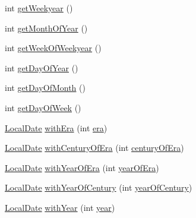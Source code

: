 \begin{DoxyCompactItemize}
\item 
int \hyperlink{classorg_1_1joda_1_1time_1_1_local_date_aee5647dfe46e2e470d4a6ff95a5ca57f}{get\-Weekyear} ()
\item 
int \hyperlink{classorg_1_1joda_1_1time_1_1_local_date_a1711091371774e1d2f689d294de21e87}{get\-Month\-Of\-Year} ()
\item 
int \hyperlink{classorg_1_1joda_1_1time_1_1_local_date_a4cbd39f9a84ff955dab9650f639df700}{get\-Week\-Of\-Weekyear} ()
\item 
int \hyperlink{classorg_1_1joda_1_1time_1_1_local_date_a07bbb72ef5101a1541d2c99e90ed78ce}{get\-Day\-Of\-Year} ()
\item 
int \hyperlink{classorg_1_1joda_1_1time_1_1_local_date_a2c9b55a760e4c8ee0895d5b6a1ae6420}{get\-Day\-Of\-Month} ()
\item 
int \hyperlink{classorg_1_1joda_1_1time_1_1_local_date_a29db7578dc289d66011f096360b4e255}{get\-Day\-Of\-Week} ()
\item 
\hyperlink{classorg_1_1joda_1_1time_1_1_local_date}{Local\-Date} \hyperlink{classorg_1_1joda_1_1time_1_1_local_date_a9f1343ab7a2914e29ab126c4b95c8d22}{with\-Era} (int \hyperlink{classorg_1_1joda_1_1time_1_1_local_date_a764d21effa733f7b34333709e7526a99}{era})
\item 
\hyperlink{classorg_1_1joda_1_1time_1_1_local_date}{Local\-Date} \hyperlink{classorg_1_1joda_1_1time_1_1_local_date_a308417bd480ca0914c1870a78744c630}{with\-Century\-Of\-Era} (int \hyperlink{classorg_1_1joda_1_1time_1_1_local_date_a927abe31f4c94f94939ff1d34b702111}{century\-Of\-Era})
\item 
\hyperlink{classorg_1_1joda_1_1time_1_1_local_date}{Local\-Date} \hyperlink{classorg_1_1joda_1_1time_1_1_local_date_ad94b501f200532ce4033332984e629bc}{with\-Year\-Of\-Era} (int \hyperlink{classorg_1_1joda_1_1time_1_1_local_date_ae0a20cf27c1dafdb02067dd8f9c06ce5}{year\-Of\-Era})
\item 
\hyperlink{classorg_1_1joda_1_1time_1_1_local_date}{Local\-Date} \hyperlink{classorg_1_1joda_1_1time_1_1_local_date_a251581fa409ce1bf41823b762e24a2a6}{with\-Year\-Of\-Century} (int \hyperlink{classorg_1_1joda_1_1time_1_1_local_date_ac4c9795a96adab4eae14266dd80ffebb}{year\-Of\-Century})
\item 
\hyperlink{classorg_1_1joda_1_1time_1_1_local_date}{Local\-Date} \hyperlink{classorg_1_1joda_1_1time_1_1_local_date_aa40d91f99c428dda9215daf79a7e26c3}{with\-Year} (int \hyperlink{classorg_1_1joda_1_1time_1_1_local_date_a0bae1887eb2fa9df0d965988d04a37de}{year})
\item 

\end{DoxyCompactItemize}
